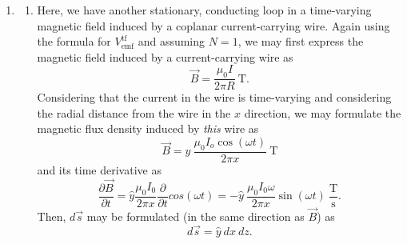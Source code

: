 \documentclass{article}
\begin{document}
\begin{enumerate}
		Substituting into the equation for \(V_{\mathrm{emf}}^{\mathrm{tr}}\) and using the height and width of the loop as the bounds of integration,
		\begin{align*}
			V_{\mathrm{emf}}^{\mathrm{tf}} &= -\int_{0}^{0.3} \int_{0}^{0.1} -\hat{x}15\pi10^7\sin{(5\pi 10^7 t - \frac{1}{3}\pi y)} \cdot \hat{x} \ dz \ dy \\
																		 &= \int_{0}^{0.3} \int_{0}^{0.1} 15\pi 10^7\sin{(5\pi10^7t-\frac{1}{3}\pi y)} \ dz \ dy \\
																		 &= \int_{0}^{0.3} 15\pi10^6\sin{(5\pi10^7t-\frac{1}{3}\pi y)} \ dy \\
																		 &=15\pi10^6 \ [\frac{3}{\pi}\cos{(5\pi10^7 t - \frac{\pi}{3} y)} \ \biggr\rvert_{0}^{0.3}] \\
																		 &=45 \times 10^6 \ [\cos{(1.57 \times 10^8t -0.3142)} - \cos{(1.57 \times 10^8t)}] \ \mathrm{\micro V} \\
																		 &=45 \ [\cos{(1.57\times10^8t - 0.3142) - \cos{(1.57 \times 10^8 t)}}] \ \mathrm{V}.
		\end{align*}

		To find current \(i\), we may use Ohm's Law and simplify the cosine terms,
		\[
			i = \frac{V_{\mathrm{emf}}^{\mathrm{tf}}}{2R} = \frac{45}{30} \ [\cos{(1.57 \times 10^8t - 0.3142)} - \cos{(1.57\times10^8t)}] \ \mathrm{A}
		\]
		with the resulting current flowing in the clockwise direction.

		\item
			\begin{enumerate}[label=\alph*)]
				\item Here, we have another stationary, conducting loop in a time-varying magnetic field induced by a coplanar current-carrying wire. Again using the formula for \(V_{\mathrm{emf}}^{\mathrm{tf}}\) and assuming \(N=1\), we may first express the magnetic field induced by a current-carrying wire as
					\[
						\vec{B} = \frac{\mu_0I}{2\pi R} \ \mathrm{T}.
					\]
					Considering that the current in the wire is time-varying and considering the radial distance from the wire in the \(x\) direction, we may formulate the magnetic flux density induced by \textit{this} wire as
					\[
						\vec{B} = \hat{y} \ \frac{\mu_0I_o\cos{(\omega t)}}{2\pi x} \ \mathrm{T}
					\]
					and its time derivative as
					\[
						\frac{\partial \vec{B}}{\partial t} = \hat{y} \frac{\mu_0 I_0}{2\pi x}\frac{\partial }{\partial t}cos{(\omega t)} = -\hat{y} \ \frac{\mu_0 I_0 \omega}{2 \pi x}\sin{(\omega t)} \ \mathrm{\frac{T}{s}}.
					\]
			Then, \(d \vec{s}\) may be formulated (in the same direction as \(\vec{B}\)) as 
			\[
			  d \vec{s} = \hat{y} \ dx \ dz.
			\]


\end{enumerate}
\end{enumerate}
\end{document}
